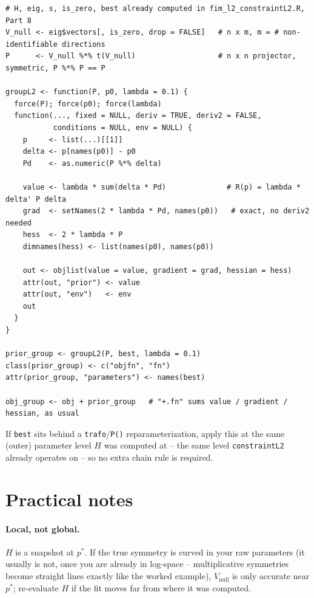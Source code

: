 \documentclass[11pt]{article}
\newcommand{\code}[1]{\texttt{#1}}
\begin{document}
\begin{lstlisting}
# H, eig, s, is_zero, best already computed in fim_l2_constraintL2.R, Part 8
V_null <- eig$vectors[, is_zero, drop = FALSE]   # n x m, m = # non-identifiable directions
P      <- V_null %*% t(V_null)                   # n x n projector, symmetric, P %*% P == P

groupL2 <- function(P, p0, lambda = 0.1) {
  force(P); force(p0); force(lambda)
  function(..., fixed = NULL, deriv = TRUE, deriv2 = FALSE,
           conditions = NULL, env = NULL) {
    p     <- list(...)[[1]]
    delta <- p[names(p0)] - p0
    Pd    <- as.numeric(P %*% delta)

    value <- lambda * sum(delta * Pd)              # R(p) = lambda * delta' P delta
    grad  <- setNames(2 * lambda * Pd, names(p0))   # exact, no deriv2 needed
    hess  <- 2 * lambda * P
    dimnames(hess) <- list(names(p0), names(p0))

    out <- objlist(value = value, gradient = grad, hessian = hess)
    attr(out, "prior") <- value
    attr(out, "env")   <- env
    out
  }
}

prior_group <- groupL2(P, best, lambda = 0.1)
class(prior_group) <- c("objfn", "fn")
attr(prior_group, "parameters") <- names(best)

obj_group <- obj + prior_group   # "+.fn" sums value / gradient / hessian, as usual
\end{lstlisting}

If \code{best} sits behind a \code{trafo}/\code{P()} reparameterization,
apply this at the same (outer) parameter level $H$ was computed at -- the
same level \code{constraintL2} already operates on -- so no extra chain rule
is required.

\section{Practical notes}

\paragraph{Local, not global.} $H$ is a snapshot at $p^*$. If the true
symmetry is curved in your raw parameters (it usually is not, once you are
already in log-space -- multiplicative symmetries become straight lines
exactly like the worked example), $V_{\mathrm{null}}$ is only accurate near
$p^*$; re-evaluate $H$ if the fit moves far from where it was computed.
\end{document}
